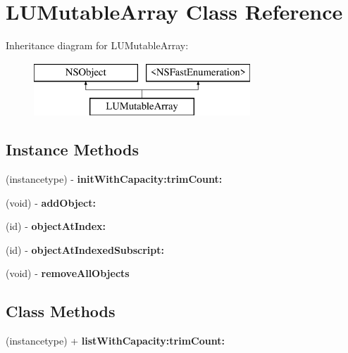 \hypertarget{interface_l_u_mutable_array}{}\section{L\+U\+Mutable\+Array Class Reference}
\label{interface_l_u_mutable_array}
Inheritance diagram for L\+U\+Mutable\+Array\+:\begin{figure}[H]
\begin{center}
\leavevmode
\includegraphics[height=2.000000cm]{interface_l_u_mutable_array}
\end{center}
\end{figure}
\subsection*{Instance Methods}
\begin{DoxyCompactItemize}
\item 
\mbox{\label{interface_l_u_mutable_array_ab2d858c8419f653109917fedffc25f17}} 
(instancetype) -\/ {\bfseries init\+With\+Capacity\+:trim\+Count\+:}
\item 
\mbox{\label{interface_l_u_mutable_array_ab467c5c0d0893b4c25213f7bc39033d8}} 
(void) -\/ {\bfseries add\+Object\+:}
\item 
\mbox{\label{interface_l_u_mutable_array_a5a19ea36953cc9d6c84d4b2e637a4338}} 
(id) -\/ {\bfseries object\+At\+Index\+:}
\item 
\mbox{\label{interface_l_u_mutable_array_a22c943f3d51e69cbc09261cde2c630a8}} 
(id) -\/ {\bfseries object\+At\+Indexed\+Subscript\+:}
\item 
\mbox{\label{interface_l_u_mutable_array_a0e0e4353b676ca4d4860524a4072f3ac}} 
(void) -\/ {\bfseries remove\+All\+Objects}
\end{DoxyCompactItemize}
\subsection*{Class Methods}
\begin{DoxyCompactItemize}
\item 
\mbox{\label{interface_l_u_mutable_array_a2c61587d8504d5b3dce57596864d3721}} 
(instancetype) + {\bfseries list\+With\+Capacity\+:trim\+Count\+:}
\end{DoxyCompactItemize}
